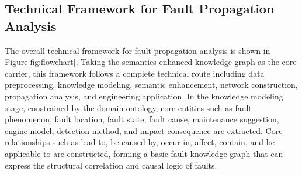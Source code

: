 \documentclass[conference]{IEEEconf}
\begin{document}
\subsection{Technical Framework for Fault Propagation Analysis}
The overall technical framework for fault propagation analysis is shown in Figure\ref{fig:flowchart}. Taking the semantics-enhanced knowledge graph as the core carrier, this framework follows a complete technical route including data preprocessing, knowledge modeling, semantic enhancement, network construction, propagation analysis, and engineering application. In the knowledge modeling stage, constrained by the domain ontology, core entities such as fault phenomenon, fault location, fault state, fault cause, maintenance suggestion, engine model, detection method, and impact consequence are extracted. Core relationships such as lead to, be caused by, occur in, affect, contain, and be applicable to are constructed, forming a basic fault knowledge graph that can express the structural correlation and causal logic of faults.
\end{document}
